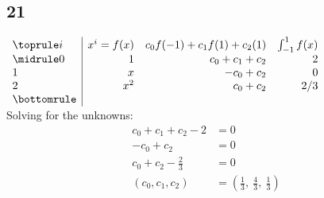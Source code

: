 \documentclass{oisinclass}
\begin{document}
\subsection*{21}
\(
\begin{array}{l|rrr}
	\toprule
	i & x^i = f(x) & c_0f(-1) + c_1f(1) + c_2(1) & \int_{-1}^{1}f(x) \\
	\midrule
	0 & 1          & c_0 + c_1 + c_2             & 2                 \\
	1 & x          & -c_0 + c_2                  & 0                 \\
	2 & x^2        & c_0 + c_2                   & 2/3               \\
	\bottomrule
\end{array}
\) \\[5ex]
Solving for the unknowns:
\begin{align*}
	c_{0} + c_{1} + c_{2} - 2   & = 0                                                         \\
	- c_{0} + c_{2}             & = 0                                                         \\
	c_{0} + c_{2} - \frac{2}{3} & = 0                                                         \\
	(c_0, c_1, c_2)             & = \left( \frac{1}{3}, \  \frac{4}{3}, \  \frac{1}{3}\right) \\
\end{align*}
\end{document}
